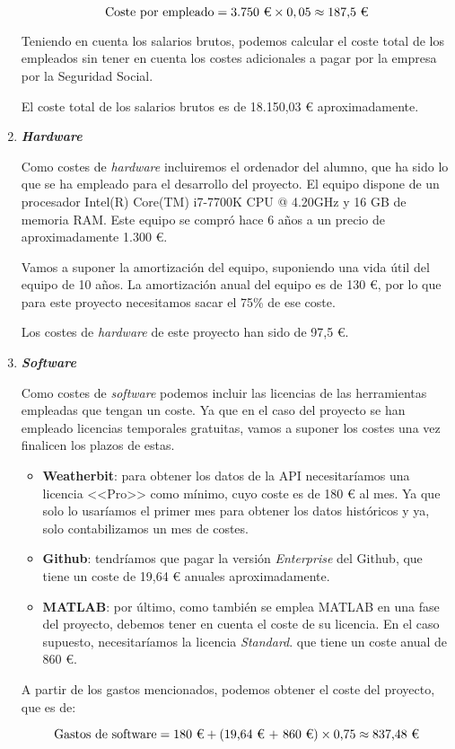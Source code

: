 \begin{enumerate}
    \[\textup{Coste por empleado} = \textup{3.750 €} \times 0,05 \approx \textup{187,5 €}\]

    \par

    Teniendo en cuenta los salarios brutos, podemos calcular el coste total de los empleados sin tener en cuenta los costes adicionales a pagar por la empresa por la Seguridad Social.

    \par

    El coste total de los salarios brutos es de 18.150,03 € aproximadamente.
    
    \item\textit{\textbf{Hardware}}
    \par

    Como costes de \textit{hardware} incluiremos el ordenador del alumno, que ha sido lo que se ha empleado para el desarrollo del proyecto. El equipo dispone de un procesador Intel(R) Core(TM) i7-7700K CPU @ 4.20GHz y 16 GB de memoria RAM. Este equipo se compró hace 6 años a un precio de aproximadamente 1.300 €.

    Vamos a suponer la amortización del equipo, suponiendo una vida útil del equipo de 10 años. La amortización anual del equipo es de 130 €, por lo que para este proyecto necesitamos sacar el 75\% de ese coste.

    Los costes de \textit{hardware} de este proyecto han sido de 97,5 €.

    \item \textbf{\textit{Software}}
    \par

    Como costes de \textit{software} podemos incluir las licencias de las herramientas empleadas que tengan un coste. Ya que en el caso del proyecto se han empleado licencias temporales gratuitas, vamos a suponer los costes una vez finalicen los plazos de estas.

    \begin{itemize}
        \item \textbf{Weatherbit}: para obtener los datos de la API necesitaríamos una licencia <<Pro>> como mínimo, cuyo coste es de 180 € al mes. Ya que solo lo usaríamos el primer mes para obtener los datos históricos y ya, solo contabilizamos un mes de costes.
        \item \textbf{Github}: tendríamos que pagar la versión \textit{Enterprise} del Github, que tiene un coste de 19,64 € anuales aproximadamente.
        \item \textbf{MATLAB}: por último, como también se emplea MATLAB en una fase del proyecto, debemos tener en cuenta el coste de su licencia. En el caso supuesto, necesitaríamos la licencia \textit{Standard}. que tiene un coste anual de 860 €.
    \end{itemize}

    A partir de los gastos mencionados, podemos obtener el coste del proyecto, que es de:

    \[\textup{Gastos de software} = \textup{180 €} + (\textup{19,64 € + 860 €}) \times \textup{0,75} \approx \textup{837,48 €}\]
\end{enumerate}


